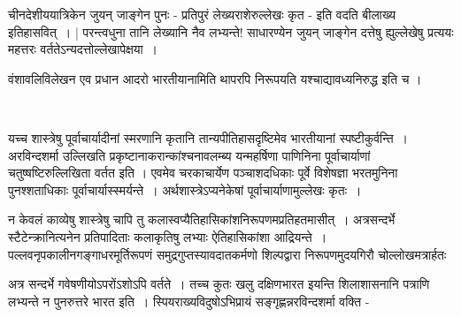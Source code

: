 \vskip 2pt

चीनदेशीययात्रिकेन जुयन् जाङ्गेन  पुनः - प्रतिपुरं  लेख्यराशेरुल्लेखः कृत - इति वदति बीलाख्य इतिहासवित्~।  | परन्त्वधुना तानि लेख्यानि नैव लभ्यन्ते! साधारण्येन जुयन् जाङ्गेन दत्तेषु ह्युल्लेखेषु प्रत्ययः महत्तरः वर्ततेऽन्यदत्तोल्लेखापेक्षया~।

वंशावलिविलेखन एव प्रधान आदरो भारतीयानामिति थापरपि निरूपयति यश्चाद्यावध्यनिरुद्ध इति च ।

\begin{myquote}

~\hfill {}
\end{myquote}

यच्च शास्त्रेषु पूर्वाचार्यादीनां स्मरणानि कृतानि तान्यपीतिहासदृष्टिमेव भारतीयानां स्पष्टीकुर्वन्ति~। अरविन्दशर्मा उल्लिखति प्रकृष्टानाकरान्कांश्चनावलम्ब्य यन्महर्षिणा पाणिनिना पूर्वाचार्याणां चतुष्षष्टिरुल्लिखिता वर्तत इति । एवमेव चरकाचार्येण पञ्चाशदधिकाः पूर्वे विशेषज्ञा भरतमुनिना पुनश्शताधिकाः पूर्वाचार्यास्स्मर्यन्ते~। अर्थशास्त्रेऽप्यनेकेषां पूर्वाचार्याणामुल्लेखः कृतः~।   

न केवलं काव्येषु शास्त्रेषु चापि तु कलास्वप्यैतिहासिकांशनिरूपणमप्रतिहतमासीत्~। अत्रसन्दर्भे स्टैटेन्क्रानित्यनेन प्रतिपादिताः कलाकृतिषु लभ्याः ऐतिहासिकांशा आद्रियन्ते~। पल्लवनृपकालीनगङ्गाधरमूर्तिरूपणं समुद्रगुप्तस्यावदातकर्मणो शिल्पद्वारा निरूपणमुदयगिरौ चोल्लोखमत्रार्हतः  

अत्र सन्दर्भे गवेषणीयोऽपरोंऽशोऽपि वर्तते~। तच्च कुतः खलु दक्षिणभारत इयन्ति शिलाशासनानि पत्राणि लभ्यन्ते न पुनरुत्तरे भारत इति~। स्पियराख्यविदुषोऽभिप्रायं सङ्गृह्णन्नरविन्दशर्मा वक्ति -

\begin{myquote}

~\hfill {}
\end{myquote}

